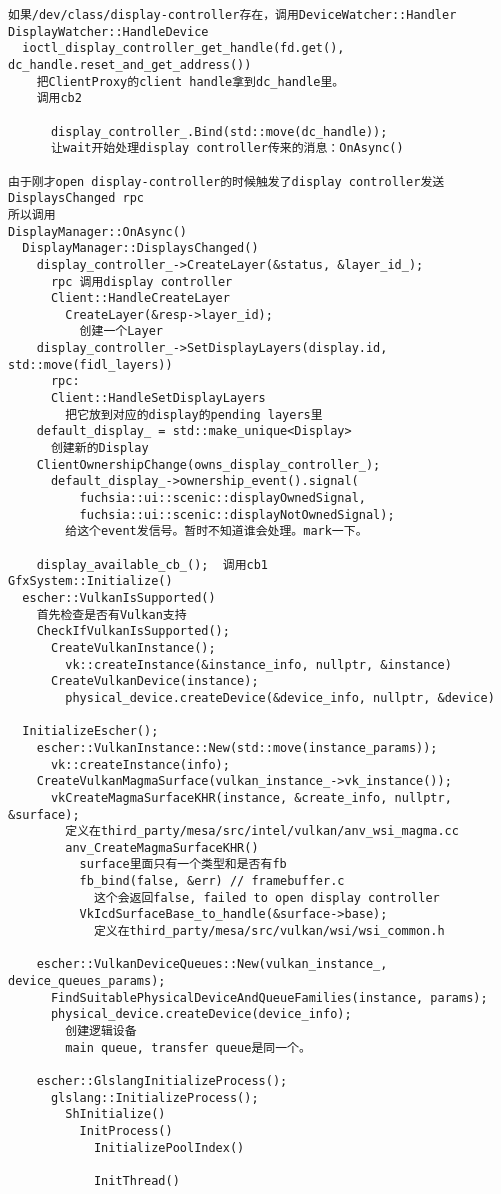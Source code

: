 \begin{verbatim}
如果/dev/class/display-controller存在，调用DeviceWatcher::Handler
DisplayWatcher::HandleDevice
  ioctl_display_controller_get_handle(fd.get(), dc_handle.reset_and_get_address())
    把ClientProxy的client handle拿到dc_handle里。
    调用cb2

      display_controller_.Bind(std::move(dc_handle));
      让wait开始处理display controller传来的消息：OnAsync()

由于刚才open display-controller的时候触发了display controller发送DisplaysChanged rpc
所以调用
DisplayManager::OnAsync()
  DisplayManager::DisplaysChanged()
    display_controller_->CreateLayer(&status, &layer_id_);
      rpc 调用display controller
      Client::HandleCreateLayer
        CreateLayer(&resp->layer_id);
          创建一个Layer
    display_controller_->SetDisplayLayers(display.id, std::move(fidl_layers))
      rpc:
      Client::HandleSetDisplayLayers
        把它放到对应的display的pending layers里
    default_display_ = std::make_unique<Display>
      创建新的Display    
    ClientOwnershipChange(owns_display_controller_);
      default_display_->ownership_event().signal(
          fuchsia::ui::scenic::displayOwnedSignal,
          fuchsia::ui::scenic::displayNotOwnedSignal);
        给这个event发信号。暂时不知道谁会处理。mark一下。

    display_available_cb_();  调用cb1
GfxSystem::Initialize()
  escher::VulkanIsSupported()
    首先检查是否有Vulkan支持
    CheckIfVulkanIsSupported();
      CreateVulkanInstance();
        vk::createInstance(&instance_info, nullptr, &instance)
      CreateVulkanDevice(instance);
        physical_device.createDevice(&device_info, nullptr, &device)

  InitializeEscher();
    escher::VulkanInstance::New(std::move(instance_params));
      vk::createInstance(info);
    CreateVulkanMagmaSurface(vulkan_instance_->vk_instance());
      vkCreateMagmaSurfaceKHR(instance, &create_info, nullptr, &surface);
        定义在third_party/mesa/src/intel/vulkan/anv_wsi_magma.cc
        anv_CreateMagmaSurfaceKHR()
          surface里面只有一个类型和是否有fb
          fb_bind(false, &err) // framebuffer.c
            这个会返回false, failed to open display controller
          VkIcdSurfaceBase_to_handle(&surface->base);
            定义在third_party/mesa/src/vulkan/wsi/wsi_common.h

    escher::VulkanDeviceQueues::New(vulkan_instance_, device_queues_params);
      FindSuitablePhysicalDeviceAndQueueFamilies(instance, params);
      physical_device.createDevice(device_info);
        创建逻辑设备
        main queue, transfer queue是同一个。

    escher::GlslangInitializeProcess();
      glslang::InitializeProcess();
        ShInitialize()
          InitProcess()
            InitializePoolIndex()

            InitThread()
\end{verbatim}